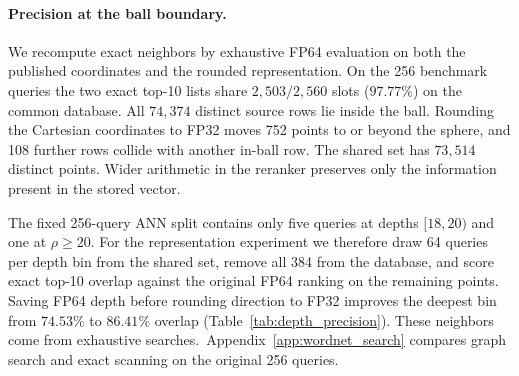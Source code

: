 \paragraph{Precision at the ball boundary.}
We recompute exact neighbors by exhaustive FP64 evaluation on both the published coordinates and the rounded representation. On the 256 benchmark queries the two exact top-10 lists share $2{,}503/2{,}560$ slots ($97.77\%$) on the common database. All $74{,}374$ distinct source rows lie inside the ball. Rounding the Cartesian coordinates to FP32 moves 752 points to or beyond the sphere, and 108 further rows collide with another in-ball row. The shared set has $73{,}514$ distinct points. Wider arithmetic in the reranker preserves only the information present in the stored vector.



The fixed 256-query ANN split contains only five queries at depths $[18,20)$ and one at $\rho\ge20$. For the representation experiment we therefore draw 64 queries per depth bin from the shared set, remove all 384 from the database, and score exact top-10 overlap against the original FP64 ranking on the remaining points. Saving FP64 depth before rounding direction to FP32 improves the deepest bin from $74.53\%$ to $86.41\%$ overlap (Table~\ref{tab:depth_precision}). These neighbors come from exhaustive searches.\ifpreprint\ Appendix~\ref{app:wordnet_search} compares graph search and exact scanning on the original 256 queries.\fi
